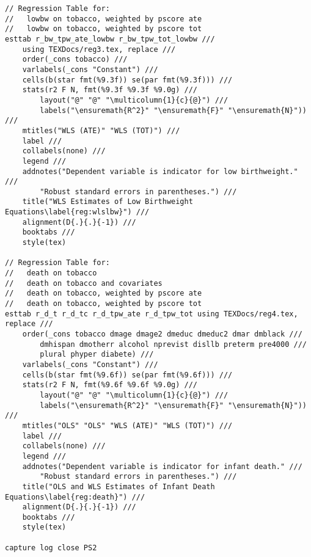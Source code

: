 \documentclass{article}
\begin{document}
\begin{verbatim}
// Regression Table for:
//   lowbw on tobacco, weighted by pscore ate
//   lowbw on tobacco, weighted by pscore tot
esttab r_bw_tpw_ate_lowbw r_bw_tpw_tot_lowbw ///
	using TEXDocs/reg3.tex, replace ///
	order(_cons tobacco) ///
	varlabels(_cons "Constant") ///
	cells(b(star fmt(%9.3f)) se(par fmt(%9.3f))) ///
	stats(r2 F N, fmt(%9.3f %9.3f %9.0g) ///
		layout("@" "@" "\multicolumn{1}{c}{@}") ///
		labels("\ensuremath{R^2}" "\ensuremath{F}" "\ensuremath{N}")) ///
	mtitles("WLS (ATE)" "WLS (TOT)") ///
	label ///
	collabels(none) ///
	legend ///
	addnotes("Dependent variable is indicator for low birthweight." ///
		"Robust standard errors in parentheses.") ///
	title("WLS Estimates of Low Birthweight Equations\label{reg:wlslbw}") ///
	alignment(D{.}{.}{-1}) ///
	booktabs ///
	style(tex)

// Regression Table for:
//   death on tobacco 
//   death on tobacco and covariates
//   death on tobacco, weighted by pscore ate
//   death on tobacco, weighted by pscore tot
esttab r_d_t r_d_tc r_d_tpw_ate r_d_tpw_tot using TEXDocs/reg4.tex, replace ///
	order(_cons tobacco dmage dmage2 dmeduc dmeduc2 dmar dmblack ///
		dmhispan dmotherr alcohol nprevist disllb preterm pre4000 ///
		plural phyper diabete) ///
	varlabels(_cons "Constant") ///
	cells(b(star fmt(%9.6f)) se(par fmt(%9.6f))) ///
	stats(r2 F N, fmt(%9.6f %9.6f %9.0g) ///
		layout("@" "@" "\multicolumn{1}{c}{@}") ///
		labels("\ensuremath{R^2}" "\ensuremath{F}" "\ensuremath{N}")) ///
	mtitles("OLS" "OLS" "WLS (ATE)" "WLS (TOT)") ///
	label ///
	collabels(none) ///
	legend ///
	addnotes("Dependent variable is indicator for infant death." ///
		"Robust standard errors in parentheses.") ///
	title("OLS and WLS Estimates of Infant Death Equations\label{reg:death}") ///
	alignment(D{.}{.}{-1}) ///
	booktabs ///
	style(tex)

capture log close PS2
\end{verbatim}
\end{document}
